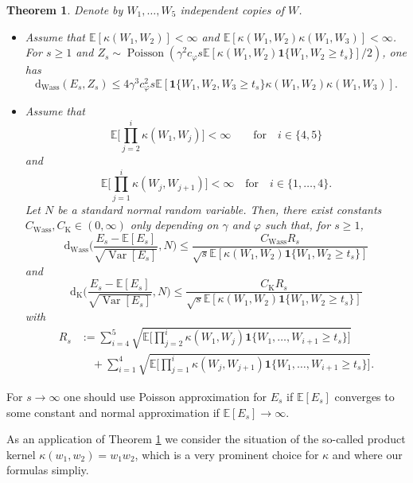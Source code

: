 \documentclass{article}
\newtheorem{theorem}{Theorem}[section]
\theoremstyle{definition}
\numberwithin{equation}{section}
\theoremstyle{remark}
\begin{document}
\begin{theorem}\label{thm:hub-to-hub-edges}
Denote by $W_1,\ldots,W_5$ independent copies of $W$.
\begin{itemize}
\item [a)] Assume that $\mathbb{E}[\kappa(W_1,W_2)]<\infty$ and $\mathbb{E}[\kappa(W_1,W_2) \kappa(W_1,W_3)]<\infty$. For $s\geq 1$ and $Z_s\sim\operatorname{Poisson}(\gamma^2 c_\varphi s \mathbb{E}[\kappa(W_1,W_2) \mathbf{1}\{W_1,W_2\geq t_s\}]/2)$, one has
$$
\mathrm{d}_{\mathrm{Wass}}(E_s, Z_s) \leq 4 \gamma^3 c_\varphi^2 s \mathbb{E}[ \mathbf{1}\{ W_1,W_2,W_3\geq t_s \} \kappa(W_1,W_2) \kappa(W_1,W_3) ].
$$
\item [b)] Assume that
$$
\mathbb{E}\bigg[\prod_{j=2}^i \kappa(W_1,W_j) \bigg]<\infty \quad \quad \text{for} \quad i\in\{4,5\}
$$
and
$$
\mathbb{E}\bigg[\prod_{j=1}^i \kappa(W_j,W_{j+1})\bigg]<\infty \quad \text{for} \quad i\in\{1,\ldots,4\} .
$$
Let $N$ be a standard normal random variable.
Then, there exist constants $C_{\mathrm{Wass}},C_{\mathrm{K}}\in(0,\infty)$ only depending on $\gamma$ and $\varphi$ such that, for $s\geq 1$,
$$
\mathrm{d}_{\mathrm{Wass}}\bigg( \frac{E_s-\mathbb{E}[E_s]}{\sqrt{\operatorname{Var}[E_s]}}, N \bigg) \leq \frac{C_{\mathrm{Wass}}  R_s}{\sqrt{s} \mathbb{E}[\kappa(W_1,W_2) \mathbf{1}\{W_1,W_2\geq t_s\}]}
$$
and
$$
\mathrm{d}_{\mathrm{K}}\bigg( \frac{E_s-\mathbb{E}[E_s]}{\sqrt{\operatorname{Var}[E_s]}}, N \bigg) \leq \frac{C_{\mathrm{K}}  R_s}{\sqrt{s} \mathbb{E}[\kappa(W_1,W_2) \mathbf{1}\{W_1,W_2\geq t_s\}]}
$$
with
\begin{align*}
R_s & := \sum_{i=4}^5 \sqrt{\mathbb{E}\bigg[\prod_{j=2}^i \kappa(W_1,W_j) \mathbf{1}\{W_1,\ldots,W_{i+1}\geq t_s\}\bigg]} \\
& \quad +\sum_{i=1}^4 \sqrt{\mathbb{E}\bigg[\prod_{j=1}^i \kappa(W_j,W_{j+1})\mathbf{1}\{W_1,\ldots,W_{i+1}\geq t_s\}\bigg]}.
\end{align*}
\end{itemize}
\end{theorem}
For $s\to\infty$ one should use Poisson approximation for $E_s$ if $\mathbb{E}[E_s]$ converges to some constant and normal approximation if $\mathbb{E}[E_s]\to\infty$.

As an application of Theorem \ref{thm:hub-to-hub-edges} we consider the situation of the so-called product kernel $\kappa(w_1,w_2)=w_1w_2$, which is a very prominent choice for $\kappa$ and where our formulas simpliy.
\end{document}

